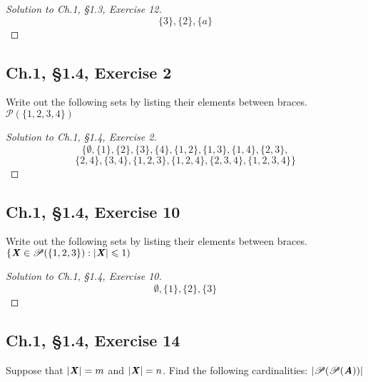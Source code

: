 \documentclass[12pt]{amsart}
\numberwithin{equation}{section}
\theoremstyle{definition}
\theoremstyle{remark}
\begin{document}
\begin{proof}[Solution to Ch.1, \S 1.3,  Exercise 12]

$$
\{ 3 \}, \{ 2 \}, \{ a \}
$$

\end{proof}




\subsection*{Ch.1, \S 1.4,  Exercise 2}  Write out the following sets by listing their elements between braces. $ \mathscr{P}( \{ 1, 2, 3, 4 \} ) $



\begin{proof}[Solution to Ch.1, \S 1.4,  Exercise 2]

$$
\{ \emptyset, \{ 1 \}, \{ 2 \}, \{ 3 \}, \{ 4 \}, \{ 1, 2 \}, \{ 1, 3 \}, \{ 1, 4 \}, \{ 2, 3 \},
$$
$$
\{ 2, 4 \},\{ 3, 4 \}, \{ 1, 2, 3 \}, \{ 1, 2, 4 \}, \{ 2, 3, 4 \}, \{ 1, 2, 3, 4 \} \}
$$

\end{proof}





\subsection*{Ch.1, \S 1.4,  Exercise 10}  Write out the following sets by listing their elements between braces. $  \{ \textbf{\textit{X}} \in \mathscr{P}( \{ 1, 2, 3 \} ) : |\textbf{\textit{X}}| \leqslant 1 ) $



\begin{proof}[Solution to Ch.1, \S 1.4,  Exercise 10]

$$
\emptyset, \{ 1 \}, \{ 2 \}, \{ 3 \}
$$

\end{proof}




\subsection*{Ch.1, \S 1.4,  Exercise 14} Suppose that $ | \textbf{\textit{X}} | = m $ and $ | \textbf{\textit{X}} | = n $. Find the following cardinalities: $ | \mathscr{P}( \mathscr{P} ( \textbf{\textit{A}} ) ) | $ 
\end{document}
